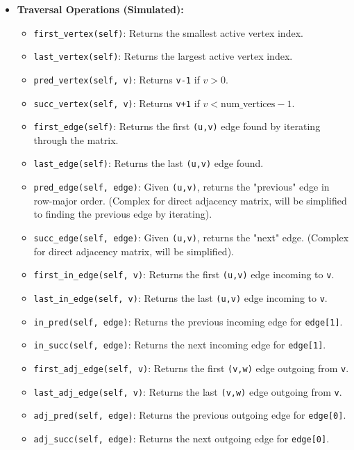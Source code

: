 \documentclass{article}
\begin{document}
\begin{itemize}
\begin{itemize}
        \item \textbf{Traversal Operations (Simulated):}
        \begin{itemize}
            \item \texttt{first\_vertex(self)}: Returns the smallest active vertex index.
            \item \texttt{last\_vertex(self)}: Returns the largest active vertex index.
            \item \texttt{pred\_vertex(self, v)}: Returns \texttt{v-1} if $v > 0$.
            \item \texttt{succ\_vertex(self, v)}: Returns \texttt{v+1} if $v < \text{num\_vertices}-1$.
            \item \texttt{first\_edge(self)}: Returns the first \texttt{(u,v)} edge found by iterating through the matrix.
            \item \texttt{last\_edge(self)}: Returns the last \texttt{(u,v)} edge found.
            \item \texttt{pred\_edge(self, edge)}: Given \texttt{(u,v)}, returns the "previous" edge in row-major order. (Complex for direct adjacency matrix, will be simplified to finding the previous edge by iterating).
            \item \texttt{succ\_edge(self, edge)}: Given \texttt{(u,v)}, returns the "next" edge. (Complex for direct adjacency matrix, will be simplified).
            \item \texttt{first\_in\_edge(self, v)}: Returns the first \texttt{(u,v)} edge incoming to \texttt{v}.
            \item \texttt{last\_in\_edge(self, v)}: Returns the last \texttt{(u,v)} edge incoming to \texttt{v}.
            \item \texttt{in\_pred(self, edge)}: Returns the previous incoming edge for \texttt{edge[1]}.
            \item \texttt{in\_succ(self, edge)}: Returns the next incoming edge for \texttt{edge[1]}.
            \item \texttt{first\_adj\_edge(self, v)}: Returns the first \texttt{(v,w)} edge outgoing from \texttt{v}.
            \item \texttt{last\_adj\_edge(self, v)}: Returns the last \texttt{(v,w)} edge outgoing from \texttt{v}.
            \item \texttt{adj\_pred(self, edge)}: Returns the previous outgoing edge for \texttt{edge[0]}.
            \item \texttt{adj\_succ(self, edge)}: Returns the next outgoing edge for \texttt{edge[0]}.
        \end{itemize}
        

\end{itemize}
\end{itemize}
\end{document}
